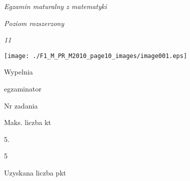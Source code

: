 \documentclass[a4paper,12pt]{article}
\begin{document}
{\it Egzamin maturalny z matematyki}

{\it Poziom rozszerzony}

{\it 11}
\begin{center}
\texttt{[image: ./F1\_M\_PR\_M2010\_page10\_images/image001.eps]}
\end{center}
Wypelnia

egzaminator

Nr zadania

Maks. liczba kt

5.

5

Uzyskana liczba pkt
\end{document}
